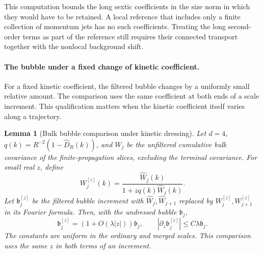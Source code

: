 \documentclass[11pt]{article}
\newtheorem{lemma}[theorem]{Lemma}
\theoremstyle{definition}
\begin{document}
This computation bounds the long sextic coefficients in the
size norm in which they would have to be retained. A local
reference that includes only a finite collection of momentum
jets has no such coefficients. Treating the long second-order
terms as part of the reference still requires their connected
transport together with the nonlocal background shift.

\paragraph{The bubble under a fixed change of kinetic coefficient.}
For a fixed kinetic coefficient, the filtered bubble changes by
a uniformly small relative amount. The comparison uses the same
coefficient at both ends of a scale increment. This qualification
matters when the kinetic coefficient itself varies along a
trajectory.

\begin{lemma}[Bulk bubble comparison under kinetic dressing]
\label{lem:kinetic-dressed-bubble}
Let \(d=4\), \(q(k)=R^{-2}(1-\widehat D_R(k))\), and
\(W_j\) be the unfiltered cumulative bulk covariance of the
finite-propagation slices, excluding the terminal covariance.
For small real \(z\), define
\begin{equation}
  W_j^{[z]}(k)=\frac{\widehat W_j(k)}{1+zq(k)\widehat W_j(k)} .
\end{equation}
Let \(\mathfrak b_j^{[z]}\) be the filtered bubble increment
with \(\widehat W_j,\widehat W_{j+1}\) replaced by
\(W_j^{[z]},W_{j+1}^{[z]}\) in its Fourier formula.
Then, with the undressed bubble \(\mathfrak b_j\),
\begin{equation}
 \mathfrak b_j^{[z]}=(1+O(\lambda |z|))\mathfrak b_j,
 \qquad
 |\partial_z\mathfrak b_j^{[z]}|\le C\lambda\mathfrak b_j .
\end{equation}
The constants are uniform in the ordinary and merged scales.
This comparison uses the same \(z\) in both terms of an increment.
\end{lemma}
\end{document}

